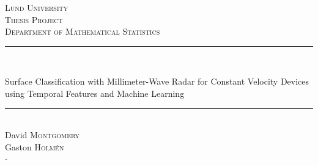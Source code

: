 \begin{titlepage}
\newcommand{\HRule}{\rule{\linewidth}{0.5mm}}

\center
 
\textsc{\LARGE Lund University}\\[1.5cm]
\textsc{\Large Thesis Project}\\[0.5cm]
\textsc{\large Department of Mathematical Statistics}\\[0.5cm]

\HRule \\%
	{ \huge Surface Classification with Millimeter-Wave Radar for Constant Velocity Devices using Temporal Features and Machine Learning\par}%
\HRule \\[1.5cm]
 

\Large David \textsc{Montgomery} \\
\Large Gaston \textsc{Holm\'en} \\

\vfill-

\end{titlepage}

